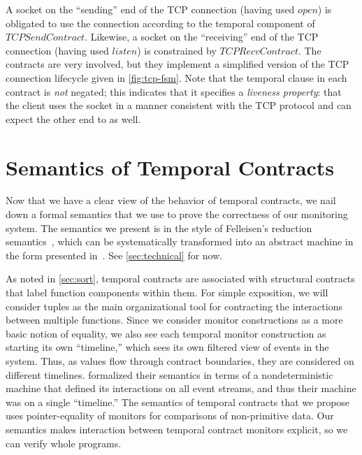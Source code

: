 \documentclass[preprint,onecolumn,9pt]{sigplanconf} %
\begin{document}
A socket on the ``sending'' end of the TCP connection (having used $open$) is obligated to use the connection according to the temporal component of $TCPSendContract$.
%
Likewise, a socket on the ``receiving'' end of the TCP connection (having used $listen$) is constrained by $TCPRecvContract$.
%
The contracts are very involved, but they implement a simplified version of the TCP connection lifecycle given in \autoref{fig:tcp-fsm}.
%
Note that the temporal clause in each contract is \emph{not} negated; this indicates that it specifies a \emph{liveness property}: that the client uses the socket in a manner consistent with the TCP protocol and can expect the other end to as well.

\section{Semantics of Temporal Contracts}

Now that we have a clear view of the behavior of temporal contracts, we nail down a formal semantics that we use to prove the correctness of our monitoring system.
%
The semantics we present is in the style of Felleisen's reduction semantics~\citep{ianjohnson:Felleisen:2009:SEP:1795772}, which can be systematically transformed into an abstract machine in the form presented in~\citet{dvanhorn:VanHorn2010Abstracting}.
%
See \autoref{sec:technical} for now.

As noted in \autoref{sec:sort}, temporal contracts are associated with structural contracts that label function components within them.
%
For simple exposition, we will consider tuples as the main organizational tool for contracting the interactions between multiple functions.
%
Since we consider monitor constructions as a more basic notion of equality, we also see each temporal monitor construction as starting its own ``timeline,'' which sees its own filtered view of events in the system.
%
Thus, as values flow through contract boundaries, they are considered on different timelines.
%
\citeauthor{ianjohnson:dfm:icfp2011} formalized their semantics in terms of a nondeterministic machine that defined its interactions on all event streams, and thus their machine was on a single ``timeline.''
%
The semantics of temporal contracts that we propose uses pointer-equality of monitors for comparisons of non-primitive data.
%
Our semantics makes interaction between temporal contract monitors explicit, so we can verify whole programs.
\end{document}

